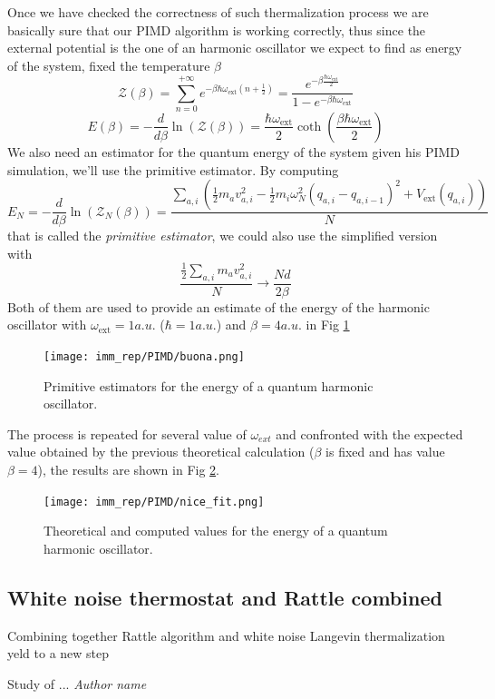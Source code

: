 \documentclass[10pt,a4paper]{article}
\begin{document}
 Once we have checked the correctness of such thermalization process we are basically sure that our PIMD algorithm is working correctly, thus since the external potential is the one of an harmonic oscillator we expect to find as energy of the system, fixed the temperature $\beta$ 
 \[\mathcal{Z}(\beta)= \sum_{n=0}^{+\infty} e^{-\beta\hbar\omega_{\text{ext}}(n+\frac{1}{2})} = \frac{e^{-\beta\frac{\hbar\omega_{\text{ext}}}{2}}}{1-e^{-\beta\hbar\omega_{\text{ext}}}}  \]
 \[E(\beta)= -\frac{d}{d\beta}\ln(\mathcal Z(\beta)) = \frac{\hbar\omega_{\text{ext}}}{2}\coth(\frac{\beta\hbar\omega_{\text{ext}}}{2}) \]
 We also need an estimator for the quantum energy of the system given his PIMD simulation, we'll use the primitive estimator. By computing 
 \[E_N = -\frac{d}{d\beta}\ln(\mathcal Z_N (\beta)) = \frac{\sum_{a,i} (\frac{1}{2}m_a v_{a,i}^2 - \frac{1}{2}m_i\omega_N^2(q_{a,i}-q_{a,i-1})^2+V_{\text{ext}}(q_{a,i}))}{N} \]
 that is called the \emph{primitive estimator}, we could also use the simplified version with 
 \[ \frac{\frac{1}{2}\sum_{a,i} m_a v_{a,i}^2}{N} \rightarrow \frac{Nd}{2\beta} \]
 Both of them are used to provide an estimate of the energy of the harmonic oscillator with $\omega_{\text{ext}} = 1 a.u.$  ($\hbar = 1 a.u.$) and $\beta= 4 a.u.$ in Fig \ref{fig: conv}
 \begin{figure}[h]
 	\begin{center}
 		\texttt{[image: imm\_rep/PIMD/buona.png]}
 	\end{center}
 	\caption{Primitive estimators for the energy of a quantum harmonic oscillator.}
 	\label{fig: conv}
 \end{figure}
The process is repeated for several value of $\omega_{ext}$ and confronted with the expected value obtained by the previous theoretical calculation ($\beta$ is fixed and has value $\beta=4$), the results are shown in Fig \ref{fig: nice}.

 \begin{figure}[h]
	\begin{center}
		\texttt{[image: imm\_rep/PIMD/nice\_fit.png]}
	\end{center}
	\caption{Theoretical and computed values for the energy of a quantum harmonic oscillator.}
	\label{fig: nice}
\end{figure}
\subsection{White noise thermostat and Rattle combined}
Combining together Rattle algorithm and white noise Langevin thermalization yeld to a new step 



\begin{thebibliography}{99}
	\begin{sloppypar}
		 Study of ...
		{\em Author name}
	\end{sloppypar}
\end{thebibliography}
\end{document}
